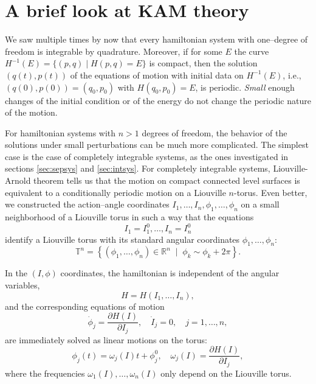 \documentclass[english,fontsize=11pt,paper=a5,oneside]{scrbook}
\newcommand{\R}{\mathbb{R}}
\newcommand{\T}{\mathbb{T}}
\theoremstyle{definition}
\begin{document}

\section{A brief look at KAM theory}

We saw multiple times by now that every hamiltonian system with one--degree of freedom is integrable by quadrature.
Moreover, if for some $E$ the curve $H^{-1}(E) = \{(p,q)\mid H(p,q) = E\}$ is compact, then the solution $(q(t),p(t))$ of the equations of motion with initial data on $H^{-1}(E)$, i.e., $(q(0), p(0)) = (q_0, p_0)$ with $H(q_0,p_0)=E$, is periodic. \emph{Small} enough changes of the initial condition or of the energy do not change the periodic nature of the motion.

For hamiltonian systems with $n>1$ degrees of freedom, the behavior of the solutions under small perturbations can be much more complicated.
The simplest case is the case of completely integrable systems, as the ones investigated in sections \ref{sec:sepsys} and \ref{sec:intsys}.
For completely integrable systems, Liouville-Arnold theorem tells us that the motion on compact connected level surfaces is equivalent to a conditionally periodic motion on a Liouville $n$-torus.
Even better, we constructed the action--angle coordinates $I_1, \ldots, I_n, \phi_1, \ldots, \phi_n$ on a small neighborhood of a Liouville torus in such a way that the equations
\begin{equation}
  I_1 = I_1^0, \ldots, I_n = I_n^0
\end{equation}
identify a Liouville torus with its standard angular coordinates $\phi_1, \ldots, \phi_n$:
\begin{equation}
  \T^n = \left\{(\phi_1, \ldots, \phi_n)\in\R^n \;\mid\; \phi_k\sim \phi_k + 2\pi\right\}.
\end{equation}

In the $(I,\phi)$ coordinates, the hamiltonian is independent of the angular variables,
\begin{equation}
  H = H(I_1, \ldots, I_n),
\end{equation}
and the corresponding equations of motion
\begin{equation}
  \dot \phi_j = \frac{\partial H(I)}{\partial I_j}, \quad
  \dot I_j = 0, \quad
  j=1,\ldots,n,
\end{equation}
are immediately solved as linear motions on the torus:
\begin{equation}
  \phi_j(t) = \omega_j(I) t + \phi_j^0, \quad \omega_j(I) = \frac{\partial H(I)}{\partial I_j},
\end{equation}
where the frequencies $\omega_1(I), \ldots, \omega_n(I)$ only depend on the Liouville torus.
\end{document}
